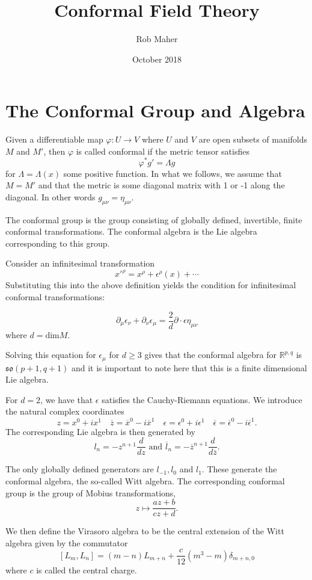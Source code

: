 \documentclass{article}
\title{Conformal Field Theory}
\author{Rob Maher}
\date{October 2018}
\newcommand{\R}{\mathbb{R}}
\begin{document}
\maketitle

\section{The Conformal Group and Algebra}

Given a differentiable map $\varphi: U \rightarrow V$ where $U$ and $V$ are open subsets of manifolds $M$ and $M'$, then $\varphi$ is called conformal if the metric tensor satisfies $$\varphi^*g'=\Lambda g$$ for $\Lambda=\Lambda(x)$ some positive function. In what we follows, we assume that $M=M'$ and that the metric is some diagonal matrix with 1 or -1 along the diagonal. In other words $g_{\mu\nu}=\eta_{\mu\nu}$.

The conformal group is the group consisting of globally defined, invertible, finite conformal transformations. The conformal algebra is the Lie algebra corresponding to this group. 

Consider an infinitesimal transformation $$x'^{\rho}=x^{\rho}+\epsilon^{\rho}(x)+\cdots$$ Substituting this into the above definition yields the condition for infinitesimal conformal transformations: 

$$\partial_{\mu}\epsilon_{\nu}+\partial_{\nu}\epsilon_{\mu}=\frac{2}{d}\partial \cdot \epsilon \eta_{\mu\nu}$$ where $d=\text{dim} M$.

Solving this equation for $\epsilon_{\mu}$ for $d \geq 3$ gives that the conformal algebra for $\R^{p,q}$ is $\mathfrak{so}(p+1,q+1)$ and it is important to note here that this is a finite dimensional Lie algebra.

For $d=2$, we have that $\epsilon$ satisfies the Cauchy-Riemann equations. We introduce the natural complex coordinates $$ z=x^0+ix^1 \quad \overline{z}=\overline{x}^0-i\overline{x}^1 \quad \epsilon=\epsilon^0+i\epsilon^1 \quad \overline{\epsilon}=\overline{\epsilon}^0-i\overline{\epsilon}^1.$$  The corresponding Lie algebra is then generated by $$l_n=-z^{n+1}\frac{d}{dz} \text{ and } \overline{l}_n=-\overline{z}^{n+1}\frac{d}{d\overline{z}}.$$

The only globally defined generators are $l_{-1},l_0$ and $l_1$. These generate the conformal algebra, the so-called Witt algebra. The corresponding conformal group is the group of M\:obius transformations, $$z \mapsto \frac{az+b}{cz+d}.$$ 

We then define the Virasoro algebra to be the central extension of the Witt algebra given by the commutator $$[L_m,L_n]=(m-n)L_{m+n}+\frac{c}{12}(m^3-m)\delta_{m+n,0}$$
where $c$ is called the central charge. 
\end{document}
